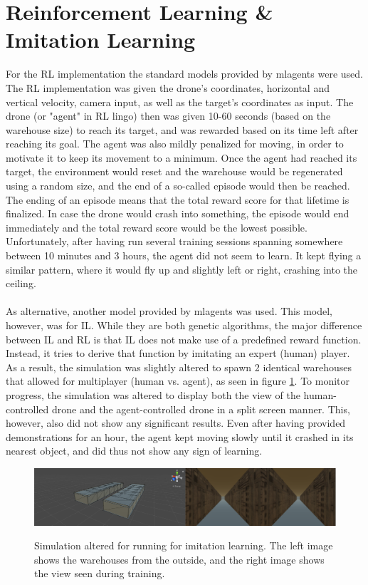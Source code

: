 \section{Reinforcement Learning \& Imitation Learning}
For the \gls{RL} implementation the standard models provided by \gls{mlagents} were used. The \gls{RL} implementation was given the drone's coordinates, horizontal and vertical velocity, camera input, as well as the target's coordinates as input. The drone (or "agent" in \gls{RL} lingo) then was given 10-60 seconds (based on the warehouse size) to reach its target, and was rewarded based on its time left after reaching its goal. The agent was also mildly penalized for moving, in order to motivate it to keep its movement to a minimum. Once the agent had reached its target, the environment would reset and the warehouse would be regenerated using a random size, and the end of a so-called episode would then be reached. The ending of an episode means that the total reward score for that lifetime is finalized. In case the drone would crash into something, the episode would end immediately and the total reward score would be the lowest possible. Unfortunately, after having run several training sessions spanning somewhere between 10 minutes and 3 hours, the agent did not seem to learn. It kept flying a similar pattern, where it would fly up and slightly left or right, crashing into the ceiling. 
\\\\
As alternative, another model provided by \gls{mlagents} was used. This model, however, was for \gls{IL}. While they are both genetic algorithms, the major difference between \gls{IL} and \gls{RL} is that \gls{IL} does not make use of a predefined reward function. Instead, it tries to derive that function by imitating an expert (human) player. As a result, the simulation was slightly altered to spawn 2 identical warehouses that allowed for multiplayer (human vs. agent), as seen in figure \ref{fig:sim_imitation_scene_training}. To monitor progress, the simulation was altered to display both the view of the human-controlled drone and the agent-controlled drone in a split screen manner. This, however, also did not show any significant results. Even after having provided demonstrations for an hour, the agent kept moving slowly until it crashed in its nearest object, and did thus not show any sign of learning.
\begin{figure}[h]
	\centering
	\includegraphics[width=\linewidth]{img/sim_imitation_scene_training}
	\label{fig:sim_imitation_scene_training}
	\caption[Simulation altered for running for imitation learning]{Simulation altered for running for imitation learning. The left image shows the warehouses from the outside, and the right image shows the view seen during training.}
\end{figure}

